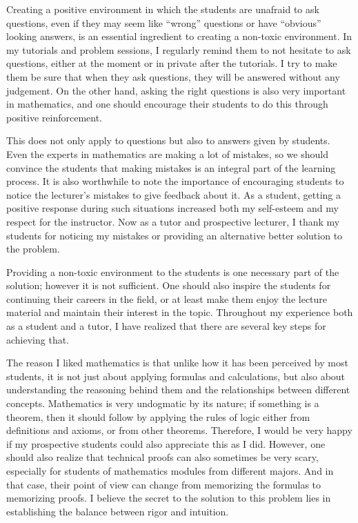 \documentclass{article}
\begin{document}
\vspace{5mm}

\par Creating a positive environment in which the students are unafraid to ask questions, even if they may seem like ``wrong'' questions or have ``obvious'' looking answers, is an essential ingredient to creating a non-toxic environment. In my tutorials and problem sessions, I regularly remind them to not hesitate to ask questions, either at the moment or in private after the tutorials. I try to make them be sure that when they ask questions, they will be answered without any judgement. On the other hand, asking the right questions is also very important in mathematics, and one should encourage their students to do this through positive reinforcement.
\vspace{5mm}

\par This does not only apply to questions but also to answers given by students. Even the experts in mathematics are making a lot of mistakes, so we should convince the students that making mistakes is an integral part of the learning process. It is also worthwhile to note the importance of encouraging students to notice the lecturer's mistakes to give feedback about it. As a student, getting a positive response during such situations increased both my self-esteem and my respect for the instructor. Now as a tutor and prospective lecturer, I thank my students for noticing my mistakes or providing an alternative better solution to the problem.

\vspace{5mm}

\par Providing a non-toxic environment to the students is one necessary part of the solution; however it is not sufficient. One should also inspire the students for continuing their careers in the field, or at least make them enjoy the lecture material and maintain their interest in the topic. Throughout my experience both as a student and a tutor, I have realized that there are several key steps for achieving that. 

\vspace{5mm}

\par The reason I liked mathematics is that unlike how it has been perceived by most students, it is not just about applying formulas and calculations, but also about understanding the reasoning behind them  and the relationships between different concepts. Mathematics is very undogmatic by its nature; if something is a theorem, then it should follow by applying the rules of logic either from definitions and axioms, or from other theorems. Therefore, I would be very happy if my prospective students could also appreciate this as I did. However, one should also realize that technical proofs can also sometimes be very scary, especially for students of mathematics modules from different majors. And in that case, their point of view can change from memorizing the formulas to memorizing proofs. I believe the secret to the solution to this problem lies in establishing the balance between rigor and intuition.
\end{document}
